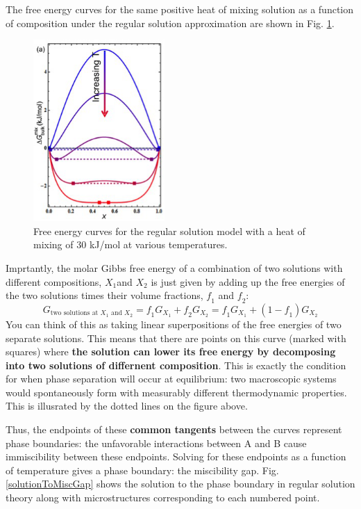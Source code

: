 \documentclass[12pt]{article}
\begin{document}
The free energy curves for the same positive heat of mixing solution as a function of composition under the regular solution approximation are shown in Fig. \ref{RegSolnCurves}.
\begin{figure}[h]
\centering
\includegraphics[width=5cm]{regularsolutionsandBraggwilliamsnotes_gr2}
\caption{Free energy curves for the regular solution model with a heat of mixing of 30 kJ/mol at various temperatures.}
\label{RegSolnCurves}
\end{figure}
Imprtantly, the molar Gibbs free energy of a combination of two solutions with different compositions, \(X_1\)and \(X_2\) is just given by adding up the free energies of the two solutions times their volume fractions, \(\mathit{f}_1\) and \(\mathit{f}_2\):
\begin{equation}
G_{\text{two solutions at } X_1\text{ and } X_2}=\mathit{f}_1 G_{X_1}+\mathit{f}_2G_{X_2}=\mathit{f}_1 G_{X_1}+\left(1-\mathit{f}_1\right)G_{X_2}
\end{equation}
You can think of this as taking linear superpositions of the free energies of two separate solutions. This means that there are points on this curve
(marked with squares) where \textbf{the solution can lower its free energy by decomposing into two solutions of differnent composition}. This is exactly the condition for when phase separation will occur at equilibrium: two macroscopic systems would spontaneously form with measurably different thermodynamic properties. This is illusrated by the dotted lines on the figure above. \par
Thus, the endpoints of these \textbf{common tangents} between the curves represent phase boundaries: the unfavorable interactions between A and B cause immiscibility between these endpoints. Solving for these endpoints as a function of temperature gives a phase boundary: the miscibility gap. Fig. \ref{solutionToMiscGap} shows the solution to the phase boundary in regular solution theory along with microstructures corresponding to each numbered point.
\end{document}
